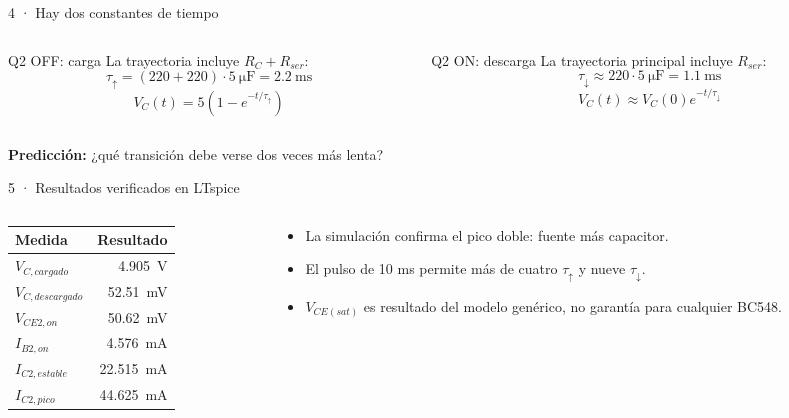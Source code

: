 \documentclass[aspectratio=169]{beamer}
\begin{document}
\begin{frame}{4 · Hay dos constantes de tiempo}
  \begin{columns}[T]
    \begin{column}{0.47\textwidth}
      \begin{block}{Q2 OFF: carga}
        La trayectoria incluye $R_C+R_{ser}$:
        \[
          \tau_{\uparrow}=(220+220)\cdot\SI{5}{\micro\farad}
          =\SI{2.2}{\milli\second}
        \]
        \[
          V_C(t)=5\left(1-e^{-t/\tau_{\uparrow}}\right)
        \]
      \end{block}
    \end{column}
    \begin{column}{0.47\textwidth}
      \begin{block}{Q2 ON: descarga}
        La trayectoria principal incluye $R_{ser}$:
        \[
          \tau_{\downarrow}\approx220\cdot\SI{5}{\micro\farad}
          =\SI{1.1}{\milli\second}
        \]
        \[
          V_C(t)\approx V_C(0)e^{-t/\tau_{\downarrow}}
        \]
      \end{block}
    \end{column}
  \end{columns}
  \textbf{Predicción:} ¿qué transición debe verse dos veces más lenta?
\end{frame}

\begin{frame}{5 · Resultados verificados en LTspice}
  \begin{columns}[T]
    \begin{column}{0.48\textwidth}
      \small
      \begin{tabular}{lr}
        \toprule
        Medida & Resultado \\
        \midrule
        $V_{C,cargado}$ & \SI{4.905}{\volt} \\
        $V_{C,descargado}$ & \SI{52.51}{\milli\volt} \\
        $V_{CE2,on}$ & \SI{50.62}{\milli\volt} \\
        $I_{B2,on}$ & \SI{4.576}{\milli\ampere} \\
        $I_{C2,estable}$ & \SI{22.515}{\milli\ampere} \\
        $I_{C2,pico}$ & \SI{44.625}{\milli\ampere} \\
        \bottomrule
      \end{tabular}
    \end{column}
    \begin{column}{0.46\textwidth}
      \begin{itemize}
        \item La simulación confirma el pico doble: fuente más capacitor.
        \item El pulso de 10 ms permite más de cuatro $\tau_{\uparrow}$ y
          nueve $\tau_{\downarrow}$.
        \item $V_{CE(sat)}$ es resultado del modelo genérico, no garantía para
          cualquier BC548.
      \end{itemize}
    \end{column}
  \end{columns}
\end{frame}
\end{document}
